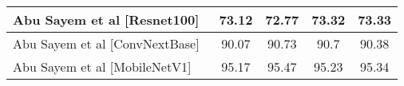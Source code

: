 \begin{table}[htbp]
\begin{adjustbox}{width=\textwidth}
\begin{tabular}{||l||ccc||ccc||ccc||ccc||}
\hline
Abu Sayem et al [Resnet100]~\cite{siam2023textilenet} & \multicolumn{3}{|c||}{73.12} & \multicolumn{3}{|c||}{72.77} & \multicolumn{3}{|c||}{73.32} & \multicolumn{3}{|c||}{73.33} \\
\hline
Abu Sayem et al [ConvNextBase]~\cite{siam2023textilenet} & \multicolumn{3}{|c||}{90.07} & \multicolumn{3}{|c||}{90.73} & \multicolumn{3}{|c||}{90.7} & \multicolumn{3}{|c||}{90.38} \\
\hline
Abu Sayem et al [MobileNetV1]~\cite{siam2023textilenet} & \multicolumn{3}{|c||}{95.17} & \multicolumn{3}{|c||}{95.47} & \multicolumn{3}{|c||}{95.23} & \multicolumn{3}{|c||}{95.34} \\
\hline\hline
\end{tabular}
\end{adjustbox}
\end{table}

